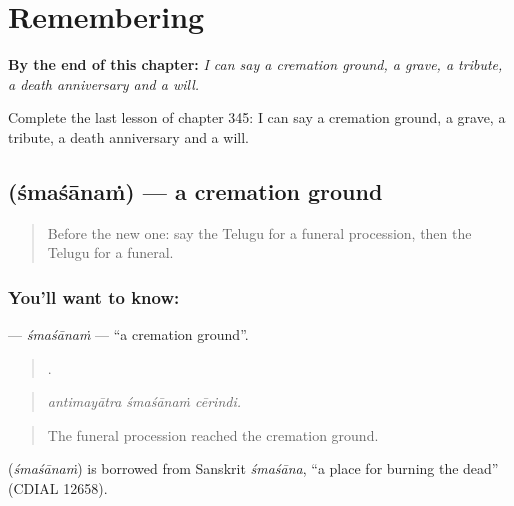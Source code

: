 
\chapter{Remembering}
\label{ch:te-remembering}

\begin{chapteropening}
\textbf{By the end of this chapter:} \emph{I can say a cremation ground, a grave, a tribute, a death anniversary and a will.}

Complete the last lesson of chapter 345: I can say a cremation ground, a grave, a tribute, a death anniversary and a will.
\end{chapteropening}

\section[\texorpdfstring{\te{శ్మశానం} (śmaśānaṁ)}{శ్మశానం (śmaśānaṁ)}]{ (śmaśānaṁ) — a cremation ground}

\label{lesson:TE-C345-smasanam}



\begin{quote}
Before the new one: say the Telugu for a funeral procession, then the Telugu for a funeral.
\end{quote}

\subsection*{You'll want to know: }
\textbf{} — \emph{śmaśānaṁ} — \textquotedblleft{}a cremation ground\textquotedblright{}.

\begin{quote}
  .
\end{quote}

\begin{quote}
\emph{antimayātra śmaśānaṁ cērindi.}
\end{quote}

\begin{quote}
The funeral procession reached the cremation ground.
\end{quote}

\begin{cousinweb}
\textbf{} (\emph{śmaśānaṁ}) is borrowed from Sanskrit \emph{śmaśāna}, \textquotedblleft{}a place for burning the dead\textquotedblright{} (CDIAL 12658).
\end{cousinweb}

